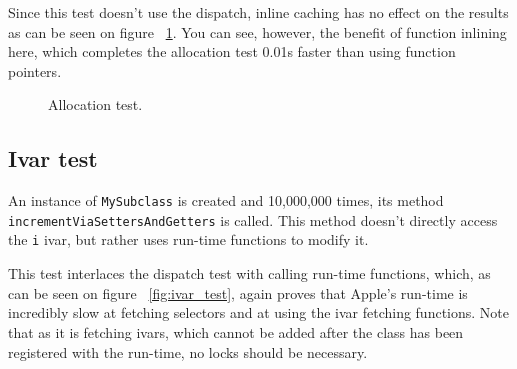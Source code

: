 Since this test doesn't use the dispatch, inline caching has no effect on the results as can be seen on figure ~\ref{fig:alloc_test}. You can see, however, the benefit of function inlining here, which completes the allocation test 0.01s faster than using function pointers.

\begin{figure}[H]
  \centering{}
  \caption{Allocation test.}
  \label{fig:alloc_test}
\end{figure}


\subsection{Ivar test}

An instance of \verb=MySubclass= is created and 10,000,000 times, its method \verb=incrementViaSettersAndGetters= is called. This method doesn't directly access the \verb=i= ivar, but rather uses run-time functions to modify it.

This test interlaces the dispatch test with calling run-time functions, which, as can be seen on figure ~\ref{fig:ivar_test}, again proves that Apple's run-time is incredibly slow at fetching selectors and at using the ivar fetching functions. Note that as it is fetching ivars, which cannot be added after the class has been registered with the run-time, no locks should be necessary.

